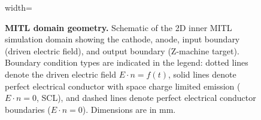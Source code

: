 \documentclass[12pt]{article}
\begin{document}
\begin{figure}[ht]
\begin{adjustbox}{width=\textwidth}
\begin{tikzpicture}[x=3mm, y=3mm, font=\small]
%
%
%
%
%
%
%

\end{tikzpicture}
    \end{adjustbox}
    \caption{\textbf{MITL domain geometry.} Schematic of the 2D inner MITL simulation domain showing the cathode, anode, input boundary (driven electric field), and output boundary (Z-machine target). Boundary condition types are indicated in the legend: dotted lines denote the driven electric field $E\cdot n = f(t)$, solid lines denote perfect electrical conductor with space charge limited emission ($E\cdot n = 0$, SCL), and dashed lines denote perfect electrical conductor boundaries ($E\cdot n = 0$). Dimensions are in mm.}
    \label{fig:mitl-diagram}
\end{figure}



\end{document}
